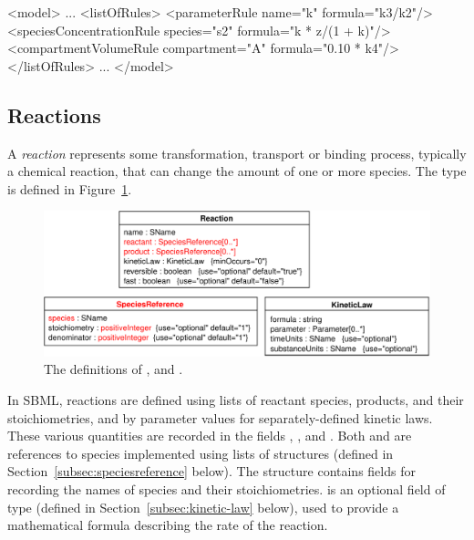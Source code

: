 \documentclass[10pt]{cekarticle}
\newcommand{\changed}[1]{\textcolor{BrickRed}{#1}}
\begin{document}
\begin{example}
<model>
    ...
    <listOfRules>
        <parameterRule name="k" formula="k3/k2"/>
        <speciesConcentrationRule species="s2" formula="k * z/(1 + k)"/>
        <compartmentVolumeRule compartment="A" formula="0.10 * k4"/>
    </listOfRules>
    ...
</model> 
\end{example}


\subsection{Reactions}
\label{sec:reactions}

A \emph{reaction} represents some transformation, transport or binding
process, typically a chemical reaction, that can change the amount of one
or more species.  The  type is defined in
Figure~\ref{fig:reaction}.  

\begin{figure}[htb]
  \centering
  \vspace*{8pt}
  \includegraphics[scale = 0.65]{figs/reaction}
  \caption{The definitions of ,  and
    \changed{}.} 
  \label{fig:reaction}
\end{figure}

In SBML, reactions are defined using lists of reactant species, products,
and their stoichiometries, and by parameter values for separately-defined
kinetic laws.  These various quantities are recorded in the fields
, , and .  Both
 and  are references to species
implemented using lists of \changed{} structures
(defined in Section~\ref{subsec:speciesreference} below).  The
\changed{} structure contains fields for recording
the names of species and their stoichiometries.   is an
optional field of type  (defined in
Section~\ref{subsec:kinetic-law} below), used to provide a mathematical
formula describing the rate of the reaction.
\end{document}

